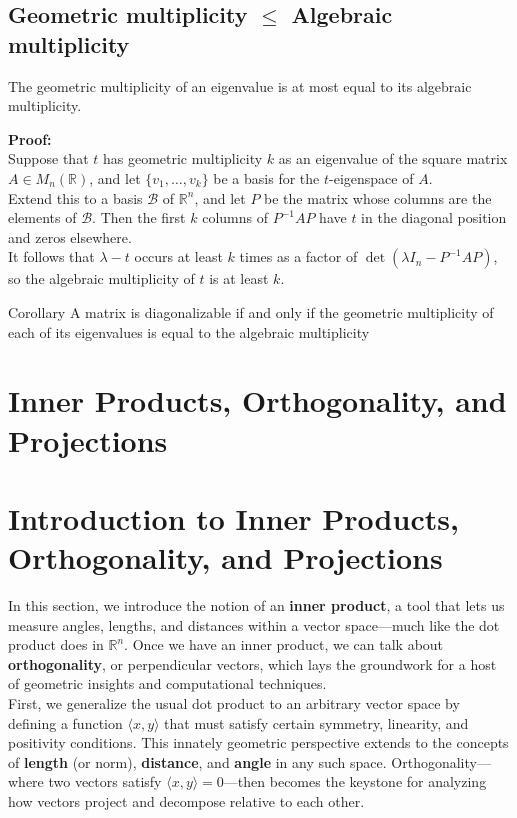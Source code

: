 \documentclass[a4paper, 9pt]{extarticle}
\begin{document}
\subsection{Geometric multiplicity $\leq$ Algebraic multiplicity}
\begin{theorembox}{}{}
  The geometric multiplicity of an eigenvalue is at most equal to its algebraic multiplicity.
\end{theorembox}
\noindent\textbf{Proof:} \\
Suppose that $t$ has geometric multiplicity $k$ as an eigenvalue of the square matrix $A \in M_n(\mathbb{R})$, and let $\{v_1, \dots, v_k\}$ be a basis for the $t$-eigenspace of $A$. \\[2ex]
Extend this to a basis $\mathcal{B}$ of $\mathbb{R}^n$, and let $P$ be the matrix whose columns are the elements of $\mathcal{B}$. Then the first $k$ columns of $P^{-1}AP$ have $t$ in the diagonal position and zeros elsewhere. \\[2ex]
It follows that $\lambda - t$ occurs at least $k$ times as a factor of $\det(\lambda I_n - P^{-1}AP)$, so the algebraic multiplicity of $t$ is at least $k$.
\begin{theorembox}{Corollary}{}
  A matrix is diagonalizable if and only if the geometric multiplicity of each of its eigenvalues is equal to the algebraic multiplicity
\end{theorembox}
\section{Inner Products, Orthogonality, and Projections}
\section*{Introduction to Inner Products, Orthogonality, and Projections}

\noindent In this section, we introduce the notion of an \textbf{inner product}, a tool that lets us measure angles, lengths, and distances within a vector space—much like the dot product does in $\mathbb{R}^n$. Once we have an inner product, we can talk about \textbf{orthogonality}, or perpendicular vectors, which lays the groundwork for a host of geometric insights and computational techniques. \\[2ex]

\noindent First, we generalize the usual dot product to an arbitrary vector space by defining a function $\langle x, y \rangle$ that must satisfy certain symmetry, linearity, and positivity conditions. This innately geometric perspective extends to the concepts of \textbf{length} (or norm), \textbf{distance}, and \textbf{angle} in any such space. Orthogonality—where two vectors satisfy $\langle x, y \rangle = 0$—then becomes the keystone for analyzing how vectors project and decompose relative to each other. \\[2ex]
\end{document}
